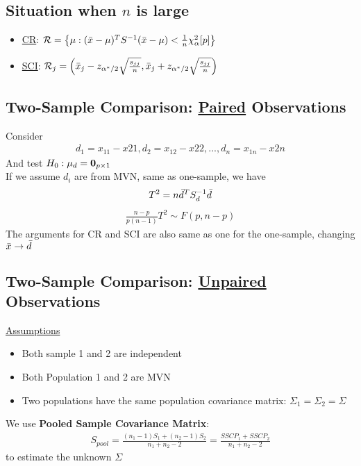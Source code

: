 \documentclass[12pt]{extarticle}
\newcommand{\<}{\langle}
\renewcommand{\>}{\rangle}
\theoremstyle{definition}
\begin{document}
\subsection{Situation when $n$ is large}
\begin{itemize}
    \item \underline{CR}:
    $\mathcal{R} = \left\{ \mu : (\Bar{x}-\mu)^T S^{-1} (\Bar{x}-\mu) < \frac{1}{n}\chi^2_{\alpha}[p] \right\}$
    \item \underline{SCI}:
    $\mathcal{R}_j = \left( \Bar{x}_j - z_{\alpha^*/2} \sqrt{\frac{s_{jj}}{n}}, \Bar{x}_j + z_{\alpha^*/2} \sqrt{\frac{s_{jj}}{n}} \right)$
\end{itemize}

\subsection{Two-Sample Comparison: \underline{Paired} Observations}
Consider 
\begin{eqnarray*}
d_1 = x_{11}-x{21}, d_2 = x_{12}-x{22}, ..., d_n = x_{1n}-x{2n} 
\end{eqnarray*}
And test $H_0: \mu_d = {\bf 0}_{p \times 1}$ \\
If we assume $d_i$ are from MVN, same as one-sample, we have
\begin{eqnarray*}
T^2 = n\Bar{d}^T S_d^{-1} \Bar{d} \end{eqnarray*}
\begin{eqnarray*}
\frac{n-p}{p(n-1)}T^2 \sim F(p, n-p)
\end{eqnarray*}
The arguments for CR and SCI are also same as one for the one-sample, changing $\Bar{x} \rightarrow \Bar{d}$ 

\newpage
\subsection{Two-Sample Comparison: \underline{Unpaired} Observations}
\underline{Assumptions}
\begin{itemize}
    \item Both sample 1 and 2 are independent\\
    \item Both Population 1 and 2 are MVN\\
    \item Two populations have the same population covariance matrix: $\Sigma_1 = \Sigma_2 = \Sigma$
\end{itemize}

We use \textbf{Pooled Sample Covariance Matrix}:
\begin{eqnarray*}
S_{pool} = \frac{(n_1 -1)S_1 + (n_2 -1)S_2}{n_1 + n_2 -2} = \frac{SSCP_1 + SSCP_2}{n_1 + n_2 -2}
\end{eqnarray*}
to estimate the unknown $\Sigma$\\
\end{document}

